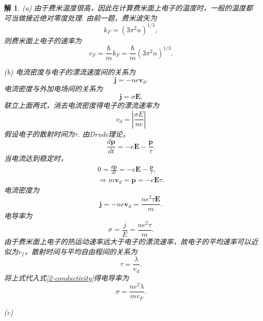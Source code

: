 \documentclass[UTF8,10pt,a4paper]{article}
\theoremstyle{Problem}
\theoremstyle{Solution}
\newtheorem*{sol}{解}
\providecommand{\abs}[1]{\left\lvert#1\right\rvert}
\begin{document}
\begin{sol}
    \item[(a)] 由于费米温度很高，因此在计算费米面上电子的温度时，一般的温度都可当做接近绝对零度处理. 由前一题，费米波矢为
    \begin{equation}
        k_F=(3\pi^2n)^{1/3},
    \end{equation}
    则费米面上电子的速率为
    \begin{equation}
        v_F=\frac{\hbar}{m}k_F=\frac{\hbar}{m}(3\pi^2n)^{1/3}.
    \end{equation}
    \item[(b)] 电流密度与电子的漂流速度间的关系为
    \begin{equation}
        \bm{j}=-ne\bm{v}_d.
    \end{equation}
    电流密度与外加电场间的关系为
    \begin{equation}
        \bm{j}=\sigma\bm{E}.
    \end{equation}
    联立上面两式，消去电流密度得电子的漂流速率为
    \begin{equation}
        v_d=\abs{\frac{\sigma E}{ne}}
    \end{equation}
    假设电子的散射时间为$\tau$. 由Drude理论，
    \begin{equation}
        \frac{d\bm{p}}{dt}=-e\bm{E}-\frac{\bm{p}}{\tau}.
    \end{equation}
    当电流达到稳定时，
    \begin{gather}
        0=\frac{d\bm{p}}{dt}=-e\bm{E}-\frac{\bm{p}}{\tau},\\
        \Longrightarrow m\bm{v}_d=\bm{p}=-e\bm{E}\tau.
    \end{gather}
    电流密度为
    \begin{equation}
        \bm{j}=-ne\bm{v}_d=\frac{ne^2\tau\bm{E}}{m}.
    \end{equation}
    电导率为
    \begin{equation}
        \label{2-conductivity}
        \sigma=\frac{j}{E}=\frac{ne^2\tau}{m}.
    \end{equation}
    由于费米面上电子的热运动速率远大于电子的漂流速率，故电子的平均速率可以近似为$v_f$，散射时间与平均自由程间的关系为
    \begin{equation}
        \tau=\frac{\lambda}{v_d}.
    \end{equation}
    将上式代入式\ref{2-conductivity}得电导率为
    \begin{equation}
        \sigma=\frac{ne^2\lambda}{mv_F}.
    \end{equation}
    \item[(c)] 

\end{sol}
\end{document}
